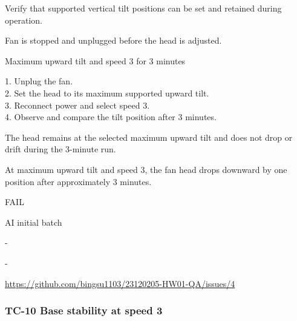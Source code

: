 \begin{description}[style=nextline,leftmargin=3.2cm]

\item[Objective] Verify that supported vertical tilt positions can be set and retained during operation.

\item[Preconditions] Fan is stopped and unplugged before the head is adjusted.

\item[Input] Maximum upward tilt and speed 3 for 3 minutes

\item[Steps] 1. Unplug the fan.\\ 2. Set the head to its maximum supported upward tilt.\\ 3. Reconnect power and select speed 3.\\ 4. Observe and compare the tilt position after 3 minutes.

\item[Expected] The head remains at the selected maximum upward tilt and does not drop or drift during the 3-minute run.

\item[Actual] At maximum upward tilt and speed 3, the fan head drops downward by one position after approximately 3 minutes.

\item[Verdict] FAIL

\item[Source] AI initial batch

\item[Edge case] -

\item[Video] -

\item[Issue] \url{https://github.com/bingsu1103/23120205-HW01-QA/issues/4}

\end{description}

\clearpage

\subsubsection{TC-10 Base stability at speed 3}

